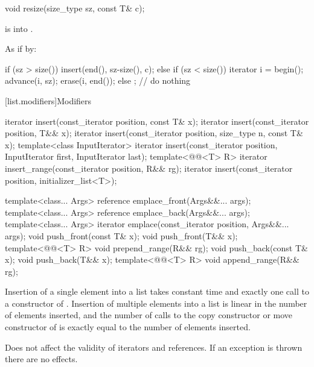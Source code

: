 %
\begin{itemdecl}
void resize(size_type sz, const T& c);
\end{itemdecl}

\begin{itemdescr}
\pnum
\expects
{} is  into .

\pnum
\effects
As if by:
\begin{codeblock}
if (sz > size())
  insert(end(), sz-size(), c);
else if (sz < size()) {
  iterator i = begin();
  advance(i, sz);
  erase(i, end());
}
else
  ;                 // do nothing
\end{codeblock}
\end{itemdescr}

[list.modifiers]{Modifiers}

%
\begin{itemdecl}
iterator insert(const_iterator position, const T& x);
iterator insert(const_iterator position, T&& x);
iterator insert(const_iterator position, size_type n, const T& x);
template<class InputIterator>
  iterator insert(const_iterator position, InputIterator first,
                  InputIterator last);
template<@@<T> R>
  iterator insert_range(const_iterator position, R&& rg);
iterator insert(const_iterator position, initializer_list<T>);

template<class... Args> reference emplace_front(Args&&... args);
template<class... Args> reference emplace_back(Args&&... args);
template<class... Args> iterator emplace(const_iterator position, Args&&... args);
void push_front(const T& x);
void push_front(T&& x);
template<@@<T> R>
  void prepend_range(R&& rg);
void push_back(const T& x);
void push_back(T&& x);
template<@@<T> R>
  void append_range(R&& rg);
\end{itemdecl}

\begin{itemdescr}
\pnum
\complexity
Insertion of a single element into a list takes constant time and
exactly one call to a constructor of
. Insertion of multiple elements into a list is linear in the
number of elements inserted, and the number of calls to the copy
constructor or move constructor of  is exactly equal
to the number of elements inserted.

\pnum
\remarks
Does not affect the validity of iterators and references.
If an exception is thrown there are no effects.
\end{itemdescr}

